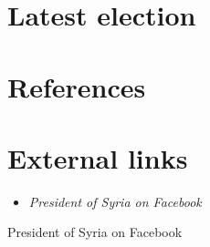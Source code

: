 \section{Latest election}\label{latest-election}

\section{References}\label{references}

\section{External links}\label{external-links}

\begin{itemize}
\item
  \emph{President of Syria on Facebook}
\end{itemize}

President of Syria on Facebook
